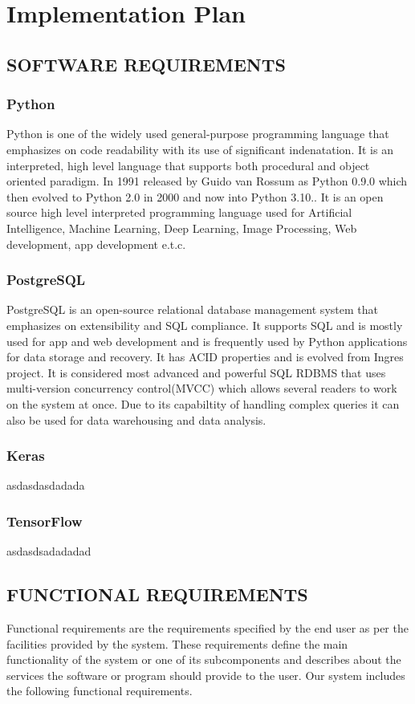 \chapter{Implementation Plan}
 \section{SOFTWARE REQUIREMENTS}
 \subsection{Python}
Python\cite{python.org} is one of the widely used general-purpose programming language that emphasizes on code readability with its use of significant indenatation. It is an interpreted, high level language that supports both procedural and object oriented paradigm. In 1991 released by Guido van Rossum as Python 0.9.0 which then evolved to Python 2.0 in 2000 and now into Python 3.10.\cite{wikipedia_python}. It is an open source high level interpreted programming language used for Artificial Intelligence, Machine Learning, Deep Learning, Image Processing, Web development, app development e.t.c. \\
\subsection{PostgreSQL}
PostgreSQL \cite{wikipedia_postgresql} is an open-source relational database management system that emphasizes on extensibility and SQL compliance. It supports SQL and is mostly used for app and web development and is frequently used by Python applications for data storage and recovery. It has ACID properties and is evolved from Ingres project. It is considered most advanced and powerful SQL RDBMS that uses multi-version concurrency control(MVCC) which allows several readers to work on the system at once. Due to its capabiltity of handling complex queries it can also be used for data warehousing and data analysis. \\
\subsection{Keras}
asdasdasdadada\\
\subsection{TensorFlow}
asdasdsadadadad
\newpage
\section{FUNCTIONAL REQUIREMENTS}
Functional requirements are the requirements specified by the end user as per the facilities provided by the system. These requirements define the main functionality of the system or one of its subcomponents and describes about the services the software or program should provide to the user. Our system includes the following functional requirements.
